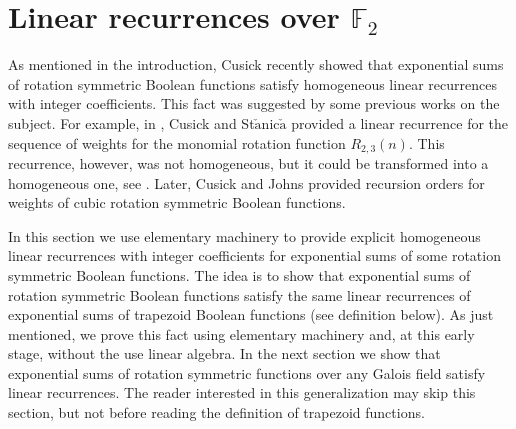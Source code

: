 \section{Linear recurrences over $\mathbb{F}_2$}
\label{linrecF2}

As mentioned in the introduction, Cusick \cite{cusickArXiv} recently showed that exponential sums of rotation symmetric Boolean functions satisfy homogeneous linear recurrences with integer coefficients.  
This fact was suggested by some previous works on the subject. For example, in \cite{cusickstanica}, Cusick and St$\check{\mbox{a}}$nic$\check{\mbox{a}}$ provided a linear recurrence for the sequence of
weights for the monomial rotation function $R_{2,3}(n)$.  This recurrence, however, was not homogeneous, but it could be transformed into a homogeneous one, see \cite{BCP}.
Later, Cusick and Johns \cite{cusickjohns} provided recursion orders for  weights of cubic rotation symmetric Boolean functions.

In this section we use elementary machinery to provide explicit homogeneous linear recurrences with integer coefficients for exponential sums of some rotation symmetric Boolean functions.  The idea is to
show that exponential sums of rotation symmetric Boolean functions satisfy the same linear recurrences of exponential sums of trapezoid Boolean functions (see definition below).  As just mentioned, we prove this fact using elementary machinery and, at this early stage, without the use linear algebra.  In the next section we show that exponential sums of rotation symmetric functions over any Galois field satisfy 
linear recurrences.  The reader interested in this generalization may skip this section, but not before reading the definition of trapezoid functions.

